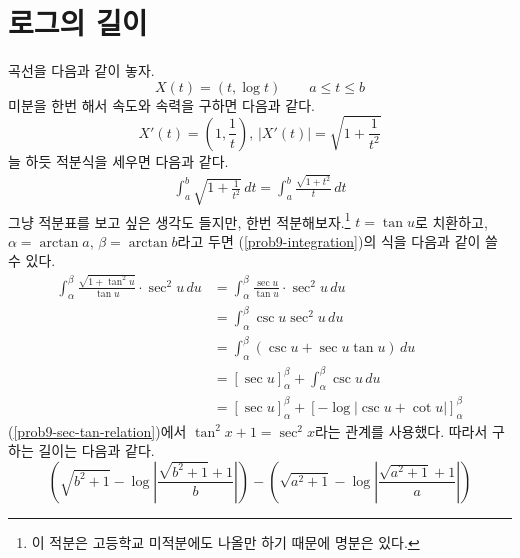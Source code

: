 \documentclass{scrartcl}
\begin{document}
\section{로그의 길이}
곡선을 다음과 같이 놓자.
\[X(t)=(t, \log t)\qquad a\leq t\leq b\]
미분을 한번 해서 속도와 속력을 구하면 다음과 같다.
\[X'(t)=\left( 1, \frac{1}{t} \right),\,|X'(t)|=\sqrt{1+\frac{1}{t^2}}\]
늘 하듯 적분식을 세우면 다음과 같다.
\begin{align}\label{prob9-integration}
\int^b_a \sqrt{1+\frac{1}{t^2}}\,dt=\int^b_a \frac{\sqrt{1+t^2}}{t}\,dt
\end{align}
그냥 적분표를 보고 싶은 생각도 들지만, 한번 적분해보자.\footnote{이 적분은 고등학교 미적분에도 나올만 하기 때문에 명분은 있다.} \(t=\tan u\)로 치환하고, \(\alpha=\arctan a,\,\beta=\arctan b\)라고 두면 (\ref{prob9-integration})의 식을 다음과 같이 쓸 수 있다.
\begin{align}
\label{prob9-sec-tan-relation}\int^\beta_\alpha \frac{\sqrt{1+\tan^2 u}}{\tan u}\cdot\sec^2u\,du&=\int^\beta_\alpha \frac{\sec u}{\tan u}\cdot\sec^2u\,du \\
&=\int^\beta_\alpha \csc u\sec^2 u\,du \nonumber \\
&=\int^\beta_\alpha (\csc u+\sec u\tan u)\,du \nonumber \\
&=\left[\sec u\right]^\beta_\alpha+\int^\beta_\alpha \csc u\,du \nonumber \\
&=\left[\sec u\right]^\beta_\alpha+[-\log\left|\csc u+\cot u\right|]^\beta_\alpha \nonumber
\end{align}
(\ref{prob9-sec-tan-relation})에서 \(\tan^2 x+1=\sec^2 x\)라는 관계를 사용했다. 따라서 구하는 길이는 다음과 같다.
\[\left(\sqrt{b^2+1}-\log\left|\frac{\sqrt{b^2+1}+1}{b}\right|\right)-\left(\sqrt{a^2+1}-\log\left|\frac{\sqrt{a^2+1}+1}{a}\right|\right)\]
\end{document}
